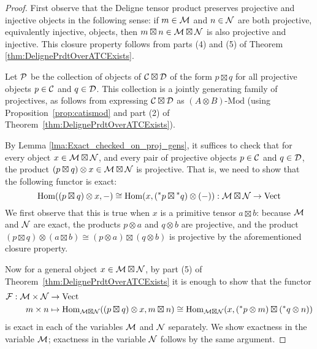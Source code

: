 \documentclass{amsart}
\begin{document}
\begin{proof} 
First observe that the Deligne tensor product preserves projective and injective objects in the following sense: if $m \in \mathcal M$ and $n \in \mathcal N$ are both projective, equivalently injective, objects, then $m \boxtimes n \in \mathcal M \boxtimes \mathcal N$ is also projective and injective.  This closure property follows from parts (4) and (5) of Theorem \ref{thm:DelignePrdtOverATCExists}.

Let $\mathcal P$ be the collection of objects of $\mathcal C \boxtimes \mathcal D$ of the form $p \boxtimes q$ for all projective objects $p \in \mathcal C$ and $q \in \mathcal D$.  This collection is a jointly generating family of projectives, as follows from expressing $\mathcal C \boxtimes \mathcal D$ as $(A \otimes B)\textrm{-}\mathrm{Mod}$ (using Proposition~\ref{prop:catismod} and part (2) of Theorem~\ref{thm:DelignePrdtOverATCExists}).

By Lemma \ref{lma:Exact_checked_on_proj_gens}, it suffices to check that for every object $x \in \mathcal M \boxtimes \mathcal N$, and every pair of projective objects $p \in \mathcal C$ and $q \in \mathcal D$, the product $(p \boxtimes q) \otimes x \in \mathcal M \boxtimes \mathcal N$ is projective.  That is, we need to show that the following functor is exact:
\begin{equation*}
	\operatorname{Hom}((p \boxtimes q) \otimes x, -) \cong \operatorname{Hom}(x, ({}^*p \boxtimes {}^*q) \otimes(-) ): \mathcal M \boxtimes \mathcal N \to \mathrm{Vect}
\end{equation*}
We first observe that this is true when $x$ is a primitive tensor $a \boxtimes b$: because $\mathcal M$ and $\mathcal N$ are exact, the products $p \otimes a$ and $q \otimes b$ are projective, and the product $(p \boxtimes q) \otimes (a \boxtimes b) \cong (p \otimes a) \boxtimes (q \otimes b)$ is projective by the aforementioned closure property.

Now for a general object $x \in \mathcal M \boxtimes \mathcal N$, by part (5) of Theorem~\ref{thm:DelignePrdtOverATCExists} it is enough to show that the functor
\begin{align*}
\mathcal F: \mathcal M \times \mathcal N &\rightarrow \mathrm{Vect} \\
m \times n &\mapsto \operatorname{Hom}_{\mathcal M \boxtimes \mathcal N}((p \boxtimes q) \otimes x, m \boxtimes n) \cong \operatorname{Hom}_{\mathcal M \boxtimes \mathcal N}(x, ({}^* p \otimes m) \boxtimes ({}^* q \otimes n))
\end{align*}
is exact in each of the variables $\mathcal M$ and $\mathcal N$ separately.  We show exactness in the variable $\mathcal M$; exactness in the variable $\mathcal N$ follows by the same argument.


\end{proof}
\end{document}
